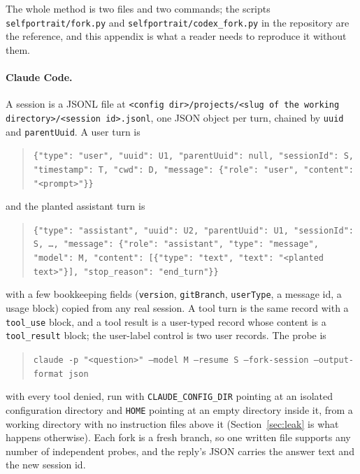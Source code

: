 \documentclass[twocolumn,10pt]{article}
\begin{document}
The whole method is two files and two commands; the scripts \texttt{selfportrait/fork.py} and \texttt{selfportrait/codex\_fork.py} in the repository are the reference, and this appendix is what a reader needs to reproduce it without them.

\paragraph{Claude Code.} A session is a JSONL file at \texttt{<config dir>/projects/<slug of the working directory>/<session id>.jsonl}, one JSON object per turn, chained by \texttt{uuid} and \texttt{parentUuid}. A user turn is
\begin{quote}\footnotesize\texttt{\{"type": "user", "uuid": U1, "parentUuid": null, "sessionId": S, "timestamp": T, "cwd": D, "message": \{"role": "user", "content": "<prompt>"\}\}}\end{quote}
and the planted assistant turn is
\begin{quote}\footnotesize\texttt{\{"type": "assistant", "uuid": U2, "parentUuid": U1, "sessionId": S, \ldots, "message": \{"role": "assistant", "type": "message", "model": M, "content": [\{"type": "text", "text": "<planted text>"\}], "stop\_reason": "end\_turn"\}\}}\end{quote}
with a few bookkeeping fields (\texttt{version}, \texttt{gitBranch}, \texttt{userType}, a message id, a usage block) copied from any real session. A tool turn is the same record with a \texttt{tool\_use} block, and a tool result is a user-typed record whose content is a \texttt{tool\_result} block; the user-label control is two user records. The probe is
\begin{quote}\footnotesize\texttt{claude -p "<question>" --model M --resume S --fork-session --output-format json}\end{quote}
with every tool denied, run with \texttt{CLAUDE\_CONFIG\_DIR} pointing at an isolated configuration directory and \texttt{HOME} pointing at an empty directory inside it, from a working directory with no instruction files above it (Section~\ref{sec:leak} is what happens otherwise). Each fork is a fresh branch, so one written file supports any number of independent probes, and the reply's JSON carries the answer text and the new session id.
\end{document}
